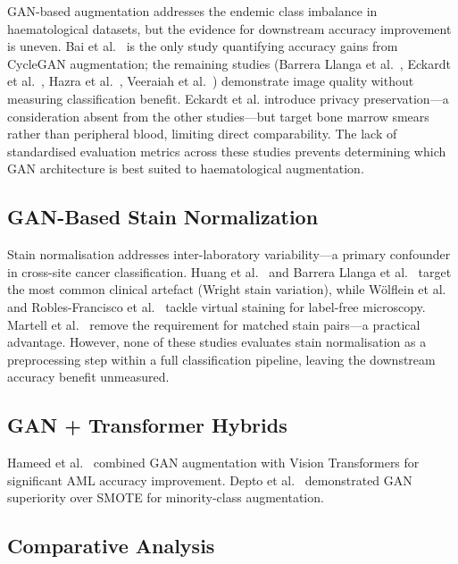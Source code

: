 GAN-based augmentation addresses the endemic class imbalance in haematological datasets, but the evidence for downstream accuracy improvement is uneven. Bai et al.~\cite{bai2022cyclegan} is the only study quantifying accuracy gains from CycleGAN augmentation; the remaining studies (Barrera Llanga et al.~\cite{barrera2023syntheticcell}, Eckardt et al.~\cite{eckardt2025stylegan}, Hazra et al.~\cite{hazra2022wgan}, Veeraiah et al.~\cite{veeraiah2023maygan}) demonstrate image quality without measuring classification benefit. Eckardt et al. introduce privacy preservation---a consideration absent from the other studies---but target bone marrow smears rather than peripheral blood, limiting direct comparability. The lack of standardised evaluation metrics across these studies prevents determining which GAN architecture is best suited to haematological augmentation.

\subsection{GAN-Based Stain Normalization}

Stain normalisation addresses inter-laboratory variability---a primary confounder in cross-site cancer classification. Huang et al.~\cite{huang2023staingan} and Barrera Llanga et al.~\cite{barrera2023stainnorm} target the most common clinical artefact (Wright stain variation), while W\"{o}lflein et al.~\cite{wolflein2023hoechst} and Robles-Francisco et al.~\cite{robles2022cyclegan} tackle virtual staining for label-free microscopy. Martell et al.~\cite{martell2023cyclegan} remove the requirement for matched stain pairs---a practical advantage. However, none of these studies evaluates stain normalisation as a preprocessing step within a full classification pipeline, leaving the downstream accuracy benefit unmeasured.

\subsection{GAN + Transformer Hybrids}

Hameed et al.~\cite{hameed2025aml} combined GAN augmentation with Vision Transformers for significant AML accuracy improvement. Depto et al.~\cite{depto2023gansmote} demonstrated GAN superiority over SMOTE for minority-class augmentation.

\subsection{Comparative Analysis}

